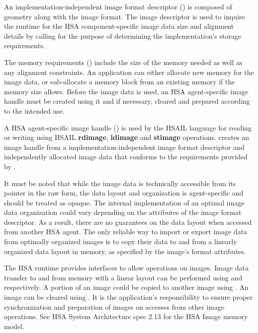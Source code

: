 \documentclass[final,oneside]{book}
\newcommand{\reffun}[1]{\textbf{#1}}
\newcommand{\refhsl}[1]{\reffun{#1}}
\begin{document}
An implementation-independent image format descriptor
() is composed of geometry along with the
image format. The image descriptor is used to inquire the runtime for the HSA
component-specific image data size and alignment details by calling
 for the purpose of determining the
implementation's storage requirements.

The memory requirements () include the size of the
memory needed as well as any alignment constraints. An application can either
allocate new memory for the image data, or sub-allocate a memory block from an
existing memory if the memory size allows. Before the image data is used, an HSA
agent-specific image handle must be created using it and if necessary, cleared
and prepared according to the intended use.

A HSA agent-specific image handle () is used by
the HSAIL language for reading or writing using HSAIL \refhsl{rdimage},
\refhsl{ldimage} and \refhsl{stimage}
operations.  creates an image handle from a
implementation-independent image format descriptor and independently allocated
image data that conforms to the requirements provided by
.

It must be noted that while the image data is technically accessible from its
pointer in the raw form, the data layout and organization is agent-specific and
should be treated as opaque. The internal implementation of an optimal image
data organization could vary depending on the attributes of the image format
descriptor. As a result, there are no guarantees on the data layout when
accessed from another HSA agent. The only reliable way to import or export image
data from optimally organized images is to copy their data to and from a
linearly organized data layout in memory, as specified by the image's format
attributes.

The HSA runtime provides interfaces to allow operations on images. Image data
transfer to and from memory with a linear layout can be performed using
 and  respectively. A
portion of an image could be copied to another image using
. An image can be cleared using
. It is the application's responsibility to ensure
proper synchronization and preparation of images on accesses from other image
operations. See HSA System Architecture spec 2.13 for the HSA Image memory
model.
\end{document}
